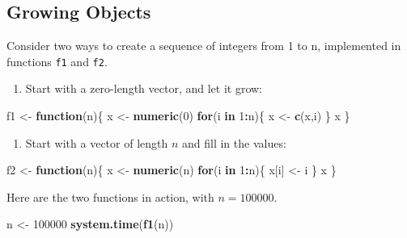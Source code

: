\documentclass[
]{krantz}
\newenvironment{Shaded}{\begin{snugshade}}{\end{snugshade}}
\newcommand{\ControlFlowTok}[1]{\textcolor[rgb]{0.13,0.29,0.53}{\textbf{#1}}}
\newcommand{\DecValTok}[1]{\textcolor[rgb]{0.00,0.00,0.81}{#1}}
\newcommand{\KeywordTok}[1]{\textcolor[rgb]{0.13,0.29,0.53}{\textbf{#1}}}
\newcommand{\NormalTok}[1]{#1}
\newcommand{\OperatorTok}[1]{\textcolor[rgb]{0.81,0.36,0.00}{\textbf{#1}}}
\newcommand{\StringTok}[1]{\textcolor[rgb]{0.31,0.60,0.02}{#1}}
\providecommand{\tightlist}{%
  \setlength{\itemsep}{0pt}\setlength{\parskip}{0pt}}
\begin{document}
\hypertarget{growing-objects}{%
\subsection{Growing Objects}\label{growing-objects}}

Consider two ways to create a sequence of integers from 1 to n, implemented in functions \texttt{f1} and \texttt{f2}.

\begin{enumerate}
\def\labelenumi{\arabic{enumi}.}
\tightlist
\item
  Start with a zero-length vector, and let it grow:
\end{enumerate}

\begin{Shaded}
\begin{Highlighting}[]
\NormalTok{f1 \textless{}{-}}\StringTok{ }\ControlFlowTok{function}\NormalTok{(n)\{}
\NormalTok{    x \textless{}{-}}\StringTok{ }\KeywordTok{numeric}\NormalTok{(}\DecValTok{0}\NormalTok{)}
    \ControlFlowTok{for}\NormalTok{(i }\ControlFlowTok{in} \DecValTok{1}\OperatorTok{:}\NormalTok{n)\{}
\NormalTok{        x \textless{}{-}}\StringTok{ }\KeywordTok{c}\NormalTok{(x,i)}
\NormalTok{    \}}
\NormalTok{    x}
\NormalTok{\}}
\end{Highlighting}
\end{Shaded}

\begin{enumerate}
\def\labelenumi{\arabic{enumi}.}
\setcounter{enumi}{1}
\tightlist
\item
  Start with a vector of length \(n\) and fill in the values:
\end{enumerate}

\begin{Shaded}
\begin{Highlighting}[]
\NormalTok{f2 \textless{}{-}}\StringTok{ }\ControlFlowTok{function}\NormalTok{(n)\{}
\NormalTok{    x \textless{}{-}}\StringTok{ }\KeywordTok{numeric}\NormalTok{(n)}
    \ControlFlowTok{for}\NormalTok{(i }\ControlFlowTok{in} \DecValTok{1}\OperatorTok{:}\NormalTok{n)\{}
\NormalTok{        x[i] \textless{}{-}}\StringTok{ }\NormalTok{i}
\NormalTok{    \}}
\NormalTok{    x}
\NormalTok{\}}
\end{Highlighting}
\end{Shaded}

Here are the two functions in action, with \(n = 100000\).

\begin{Shaded}
\begin{Highlighting}[]
\NormalTok{n \textless{}{-}}\StringTok{ }\DecValTok{100000}
\KeywordTok{system.time}\NormalTok{(}\KeywordTok{f1}\NormalTok{(n))}
\end{Highlighting}
\end{Shaded}
\end{document}
